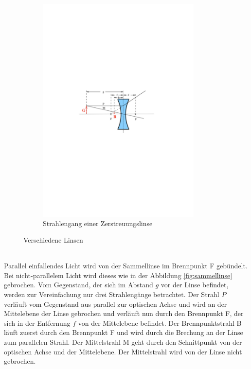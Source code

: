 \begin{figure}[h!]
\begin{subfigure}{0.49\textwidth}
  \includegraphics[width=0.9\textwidth]{streuungslinse.pdf}
  \caption{Strahlengang einer Zerstreuungslinse \cite{1}}
  \label{fig:streuungslinse}
 \end{subfigure}
 \caption{Verschiedene Linsen}
 \label{fig:linsen}
\end{figure}
\\Parallel einfallendes Licht wird von der Sammellinse im Brennpunkt F gebündelt.
Bei nicht-parallelem Licht wird dieses wie in der Abbildung \ref{fig:sammellinse} gebrochen.
Vom Gegenstand, der sich im Abstand $g$ vor der Linse befindet, werden zur Vereinfachung nur drei Strahlengänge betrachtet.
Der Strahl $P$ verläuft vom Gegenstand aus parallel zur optischen Achse und wird an der Mittelebene der Linse gebrochen und verläuft nun durch den Brennpunkt F, der sich in der Entfernung $f$ von der Mittelebene befindet.
Der Brennpunktstrahl B läuft zuerst durch den Brennpunkt F und wird durch die Brechung an der Linse zum parallelen Strahl.
Der Mittelstrahl M geht durch den Schnittpunkt von der optischen Achse und der Mittelebene. Der Mittelstrahl wird von der Linse nicht gebrochen.
